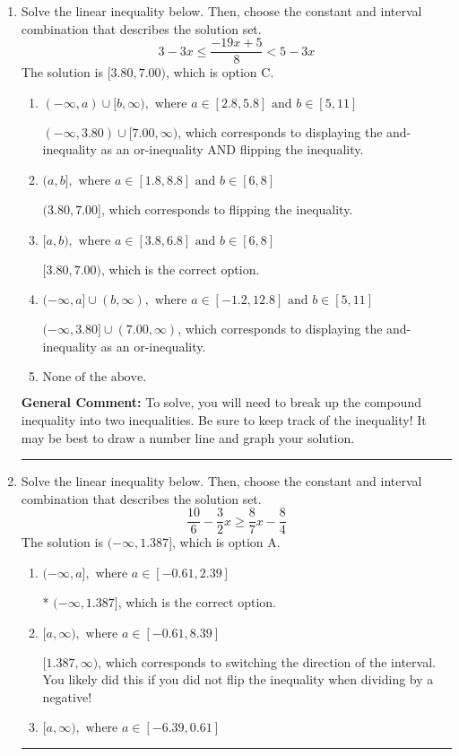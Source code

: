 \documentclass{extbook}[14pt]
\newcommand{\litem}[1]{\item #1

\rule{\textwidth}{0.4pt}}
\begin{document}
\begin{enumerate}\litem{
Solve the linear inequality below. Then, choose the constant and interval combination that describes the solution set.
\[ 3 - 3 x \leq \frac{-19 x + 5}{8} < 5 - 3 x \]The solution is \( [3.80, 7.00) \), which is option C.\begin{enumerate}[label=\Alph*.]
\item \( (-\infty, a) \cup [b, \infty), \text{ where } a \in [2.8, 5.8] \text{ and } b \in [5, 11] \)

$(-\infty, 3.80) \cup [7.00, \infty)$, which corresponds to displaying the and-inequality as an or-inequality AND flipping the inequality.
\item \( (a, b], \text{ where } a \in [1.8, 8.8] \text{ and } b \in [6, 8] \)

$(3.80, 7.00]$, which corresponds to flipping the inequality.
\item \( [a, b), \text{ where } a \in [3.8, 6.8] \text{ and } b \in [6, 8] \)

$[3.80, 7.00)$, which is the correct option.
\item \( (-\infty, a] \cup (b, \infty), \text{ where } a \in [-1.2, 12.8] \text{ and } b \in [5, 11] \)

$(-\infty, 3.80] \cup (7.00, \infty)$, which corresponds to displaying the and-inequality as an or-inequality.
\item \( \text{None of the above.} \)


\end{enumerate}

\textbf{General Comment:} To solve, you will need to break up the compound inequality into two inequalities. Be sure to keep track of the inequality! It may be best to draw a number line and graph your solution.
}
\litem{
Solve the linear inequality below. Then, choose the constant and interval combination that describes the solution set.
\[ \frac{10}{6} - \frac{3}{2} x \geq \frac{8}{7} x - \frac{8}{4} \]The solution is \( (-\infty, 1.387] \), which is option A.\begin{enumerate}[label=\Alph*.]
\item \( (-\infty, a], \text{ where } a \in [-0.61, 2.39] \)

* $(-\infty, 1.387]$, which is the correct option.
\item \( [a, \infty), \text{ where } a \in [-0.61, 8.39] \)

 $[1.387, \infty)$, which corresponds to switching the direction of the interval. You likely did this if you did not flip the inequality when dividing by a negative!
\item \( [a, \infty), \text{ where } a \in [-6.39, 0.61] \)


\end{enumerate}}
\end{enumerate}
\end{document}

